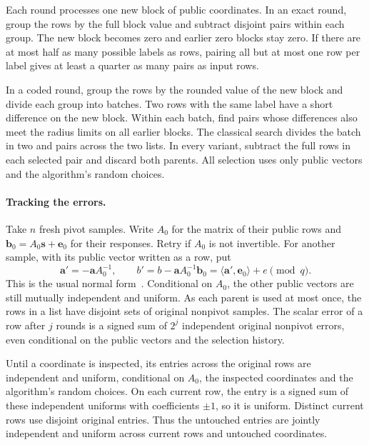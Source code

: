 \documentclass[runningheads,envcountsame,envcountsect,orivec]{llncs}
\begin{document}
Each round processes one new block of public coordinates. In an exact
round, group the rows by the full block value and subtract disjoint
pairs within each group. The new block becomes zero and earlier zero
blocks stay zero. If there are at most half as many possible labels
as rows, pairing all but at most one row per label gives at least
a quarter as many pairs as input rows.

In a coded round, group the rows by the rounded value of the new
block and divide each group into batches. Two rows with the same
label have a short difference on the new block. Within each batch,
find pairs whose differences also meet the radius limits on all
earlier blocks. The classical search divides the batch in two and
pairs across the two lists. In every variant, subtract the full
rows in each selected pair and discard both parents. All selection
uses only public vectors and the algorithm's random choices.

\paragraph{Tracking the errors.}
Take $n$ fresh pivot samples. Write $A_0$ for the matrix of their
public rows and $\boldsymbol b_0=A_0\boldsymbol s+\boldsymbol e_0$
for their responses. Retry if $A_0$ is not invertible. For another sample,
with its public vector written as a row, put
\begin{equation}
 \boldsymbol a'=-\boldsymbol aA_0^{-1},\qquad
 b'=b-\boldsymbol aA_0^{-1}\boldsymbol b_0
    =\langle\boldsymbol a',\boldsymbol e_0\rangle+e\pmod q .
 \label{eq:normal}
\end{equation}
This is the usual normal form~\cite{ACPS09}. Conditional on $A_0$,
the other public vectors are still mutually independent and uniform.
As each parent is used at most once, the rows in a list have
disjoint sets of original nonpivot samples. The scalar error
of a row after $j$ rounds is a signed sum of $2^j$ independent
original nonpivot errors, even conditional on the public vectors
and the selection history.

Until a coordinate is inspected, its entries across the original
rows are independent and uniform, conditional on $A_0$, the
inspected coordinates and the algorithm's random choices.
On each current row, the entry is a signed sum of these
independent uniforms with coefficients $\pm1$, so it is uniform.
Distinct current rows use disjoint original entries. Thus the
untouched entries are jointly independent and uniform across
current rows and untouched coordinates.
\end{document}
